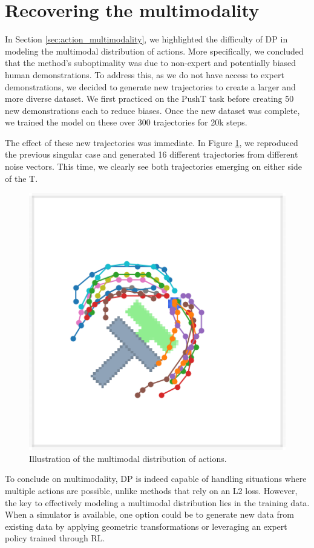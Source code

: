 \section{Recovering the multimodality}

In Section \ref{sec:action_multimodality}, we highlighted the difficulty of DP in modeling
the multimodal distribution of actions.
More specifically, we concluded that the method's suboptimality was due to non-expert and potentially
biased human demonstrations.
To address this, as we do not have access to expert demonstrations,
we decided to generate new trajectories to create a larger and more diverse dataset.
We first practiced on the PushT task before creating 50 new demonstrations each to reduce biases.
Once the new dataset was complete, we trained the model on these over 300 trajectories for 20k steps.

The effect of these new trajectories was immediate.
In Figure \ref{fig:multimodality_new}, we reproduced the previous singular case and generated 16
different trajectories from different noise vectors.
This time, we clearly see both trajectories emerging on either side of the T.
\begin{figure}[!htb]
    \centering
    \includegraphics[width=0.6\linewidth]{figures/trajectories_multimodality.png}
    \caption{Illustration of the multimodal distribution of actions.}
    \label{fig:multimodality_new}
\end{figure}
To conclude on multimodality, DP is indeed capable of handling situations where multiple actions are possible,
unlike methods that rely on an L2 loss. However, the key to effectively modeling a multimodal distribution
lies in the training data. When a simulator is available, one option could be to generate new data
from existing data by applying geometric transformations or leveraging an expert policy trained through RL.